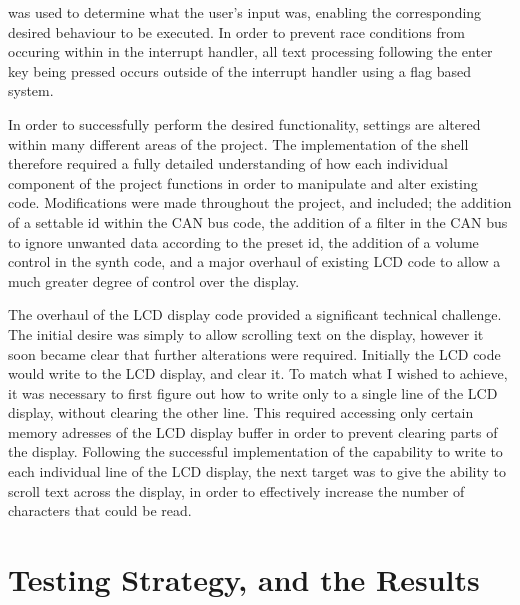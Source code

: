 was used to determine what the user's input was, enabling the corresponding desired 
behaviour to be executed. In order to prevent race conditions from occuring within in the 
interrupt handler, all text processing following the enter key being pressed occurs 
outside of the interrupt handler using a flag based system.
\par\bigskip\noindent
In order to successfully perform the desired functionality, settings are altered within many 
different areas of the project. The implementation of the shell therefore required a 
fully detailed understanding of how each individual component of the project functions
in order to manipulate and alter existing code. Modifications were made throughout 
the project, and included; the addition of a settable id within the CAN bus code, 
the addition of a filter in the CAN bus to ignore unwanted data 
according to the preset id, the addition of a volume control in the synth code, and a major 
overhaul of existing LCD code to allow a much greater degree of control over the display. 
\par\bigskip\noindent
The overhaul of the LCD display code provided a significant technical challenge. The initial 
desire was simply to allow scrolling text on the display, however it soon became clear that 
further alterations were required. Initially the LCD code would write to the LCD display, and 
clear it. To match what I wished to achieve, it was necessary to first figure out how to write 
only to a single line of the LCD display, without clearing the other line. This required 
accessing only certain memory adresses of the LCD display buffer in order to prevent clearing 
parts of the display. Following the successful implementation of the capability to write to 
each individual line of the LCD display, the next target was to give the ability to scroll 
text across the display, in order to effectively increase the number of characters that could be read. 


\section{Testing Strategy, and the Results}
